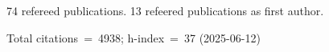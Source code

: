74 refereed publications. 13 refeered publications as first author.

Total citations~=~4938; h-index~=~37 (2025-06-12)